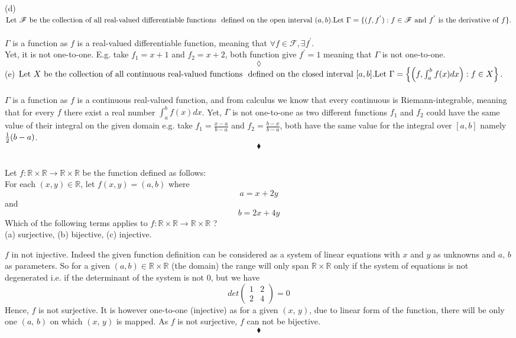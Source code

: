 (d) $\text{Let } \mathscr{F}\text{ be the collection of all real-valued differentiable functions }\\ 
\text{ defined on the open interval } (a,b). 
\text{Let }\Gamma=\{(f,f^{'}):f\in\mathscr{F} \text{ and }f^{'} \text{ is the derivative of } f\}.$ \\\\
$\Gamma$ is a function as $f$ is a real-valued differentiable function, meaning that $\forall f\in \mathscr{F}, \exists f^{'}$.\\
Yet, it is not one-to-one. E.g. take $f_1 = x+1$ and $f_2= x+2$, both function give $f^{'}= 1$ meaning that $\Gamma$ is not one-to-one.
$$\lozenge$$
(e) $\text{Let } X \text{ be the collection of all continuous real-valued functions }\\ 
\text{ defined on the closed interval } [a,b]. \\
\text{Let }\Gamma=\left\{\left ( f,\int_a^b f(x)dx\right):f\in X  \right \}.  $ \\\\
$\Gamma$ is a function as $f$ is a continuous real-valued function, and from calculus we know that every continuous is Riemann-integrable, meaning that for every $f$ there exist a real number $\int_a^b f(x)dx$. Yet,  $\Gamma$ is not one-to-one as two  
different functions $f_1$ and $f_2$ could have the same value of their integral on the given domain e.g. take $f_1= \frac{x-a}{b-a}$ and $f_2= \frac{b-x}{b-a}$, both have the same value for the integral over $[a,b]$ namely $\frac{1}{2}(b-a)$.
$$\blacklozenge$$

\subsection{}
\begin{tcolorbox}
Let $f:\mathbb{R}\times \mathbb{R}\rightarrow \mathbb{R}\times \mathbb{R}$ be the function defined as follows: \\
For each $(x,y) \in \mathbb{R}$, let $f(x,y) = (a,b)$ where
$$a= x+ 2y$$
and
$$b= 2x+4y$$
Which of the following terms applies to  $f:\mathbb{R}\times \mathbb{R}\rightarrow \mathbb{R}\times \mathbb{R}$ ?\\
(a) surjective, (b) bijective, (c) injective.
\end{tcolorbox}
$f$ in not injective. Indeed the given function definition can be considered as a system of linear equations with $x$ and $y$ as unknowns and $a,\, b$ as parameters. So for a given $(a,b)  \in \mathbb{R}\times \mathbb{R}$ (the domain) the range will only span $\mathbb{R}\times \mathbb{R}$ only if the system of equations is not degenerated i.e. if the determinant of the system is not $0$, but we have $$det\left(\begin{matrix}1&2\\2&4\end{matrix}\right) =0$$
Hence, $f$ is not surjective. It is however one-to-one (injective) as for a given $(x,\, y)$, due to linear form of the function, there will be only one $(a,\, b)$ on which $(x,\, y)$ is mapped. As $f$ is not surjective, $f$ can not be bijective.
$$\blacklozenge$$
\newpage
